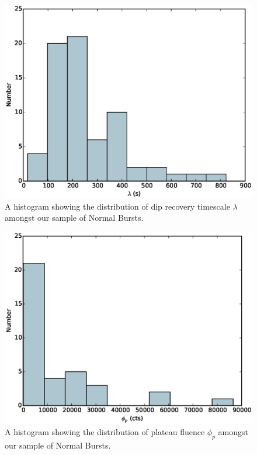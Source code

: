 \begin{figure}
  \centering
  \includegraphics[width=.9\linewidth, trim={0cm 0 0cm 0},clip]{images/appendix_lambda_hist.eps}
  \caption{\small A histogram showing the distribution of dip recovery timescale $\lambda$ amongst our sample of Normal Bursts.}
  \label{fig:app_hist_lamb}
\end{figure}

\begin{figure}
  \centering
  \includegraphics[width=.9\linewidth, trim={0cm 0 0cm 0},clip]{images/appendix_plat_aafluence_hist.eps}
  \caption{\small A histogram showing the distribution of plateau fluence $\phi_p$ amongst our sample of Normal Bursts.}
  \label{fig:app_hist_phip}
\end{figure}

